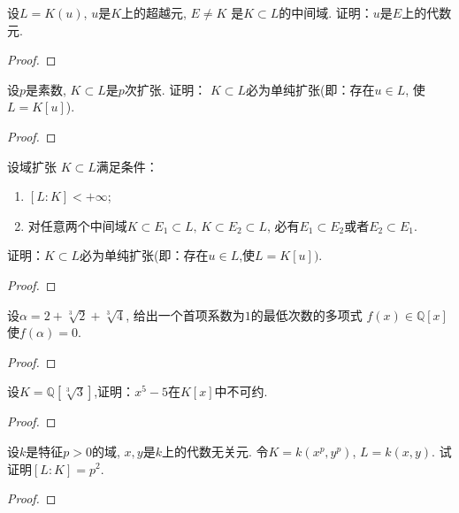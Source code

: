 \begin{problem}
    设$L = K(u)$, $u$是$K$上的超越元, $E \neq K$
是$K\subset L$的中间域. 证明：$u$是$E$上的代数元.
\end{problem}

\begin{proof}
    
\end{proof}

\begin{problem}
    设$p$是素数, $K \subset L$是$p$次扩张. 证明：
$K \subset L$必为单纯扩张(即：存在$u \in L$, 使$L = K[u]$).
\end{problem}

\begin{proof}
    
\end{proof}

\begin{problem}
    设域扩张 $K \subset L$满足条件：
\begin{enumerate}[(1)]
    \item $[L:K] < +\infty$;
    \item 对任意两个中间域$K \subset E_1 \subset L,\, K \subset E_2 \subset L$,
必有$E_1 \subset E_2$或者$E_2 \subset E_1$.
\end{enumerate}
证明：$K \subset L$必为单纯扩张(即：存在$u \in L$,使$L = K[u])$.
\end{problem}

\begin{proof}
    
\end{proof}

\begin{problem}
    设$\alpha = 2 + \sqrt[3]{2} + \sqrt[3]{4}$,
给出一个首项系数为$1$的最低次数的多项式
$f(x) \in \mathbb{Q}[x]$使$f(\alpha) = 0$.
\end{problem}

\begin{proof}
    
\end{proof}

\begin{problem}
    设$K = \mathbb{Q}[\sqrt[3]{3}]$,证明：$x^5 - 5$在$K[x]$中不可约.
\end{problem}

\begin{proof}
    
\end{proof}

\begin{problem}
    设$k$是特征$p > 0$的域, $x, y$是$k$上的代数无关元.
令$K = k(x^{p}, y^{p})$, $L = k(x, y)$. 
试证明$[L:K] = p^{2}$.
\end{problem}

\begin{proof}
    
\end{proof}